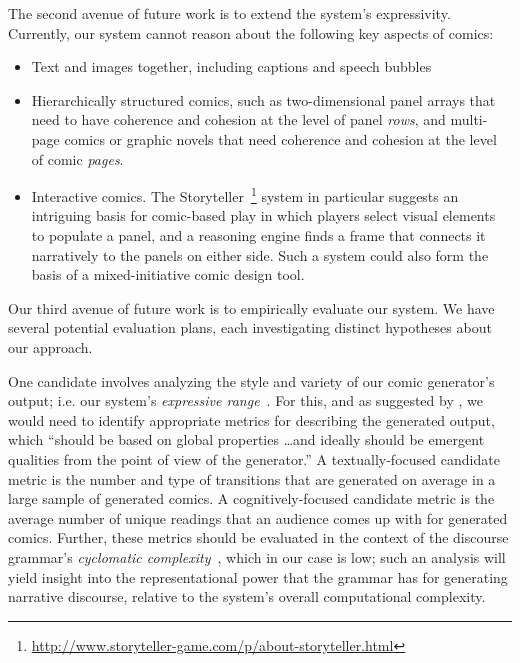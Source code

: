 The second avenue of future work is to extend the system's expressivity.
Currently, our system cannot reason about the following key aspects of
comics:
\begin{itemize}
\item Text and images together, including captions and speech bubbles
\item Hierarchically structured comics, such as two-dimensional panel
arrays that need to have coherence and cohesion at the level of panel {\em
rows}, and multi-page comics or graphic novels that need coherence and
cohesion at the level of comic {\em pages}.
\item Interactive comics. The
Storyteller~\footnote{\url{http://www.storyteller-game.com/p/about-storyteller.html}}
system in particular suggests an intriguing basis for comic-based play in
which players select visual elements to populate a panel, and a reasoning
engine finds a frame that connects it narratively to the panels on either side.
Such a system could also form the basis of a mixed-initiative comic design
tool.
\end{itemize}

Our third avenue of future work is to empirically evaluate our system.  We
have several potential evaluation plans, each investigating distinct
hypotheses about our approach.

One candidate involves analyzing the style and variety of our
comic generator's output; i.e. our system's 
\emph{expressive range}~\cite{smith2010analyzing}. For this, and as
suggested by \citeauthor{smith2010analyzing}, we would need to identify
appropriate metrics for describing the generated output, which ``should be
based on global properties \ldots and ideally should be emergent qualities
from the point of view of the generator.'' A textually-focused candidate 
metric is the number and type of transitions that are generated on average
in a large sample of generated comics. A cognitively-focused candidate
metric is the average number of unique readings that an audience comes up
with for generated comics. Further, these metrics should be evaluated in
the context of the discourse grammar's \emph{cyclomatic
complexity}~\cite{mccabe1976complexity}, which in our case is low; such an
analysis will yield insight into the representational power that the
grammar has for generating narrative discourse, relative to the system's
overall computational complexity.


